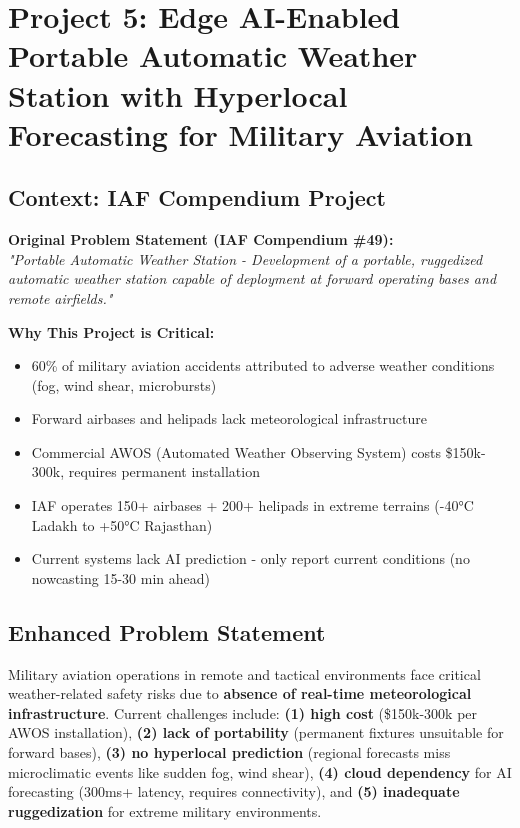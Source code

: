 \section{Project 5: Edge AI-Enabled Portable Automatic Weather Station with Hyperlocal Forecasting for Military Aviation}

\subsection{Context: IAF Compendium Project}

\textbf{Original Problem Statement (IAF Compendium \#49):} \\
\textit{"Portable Automatic Weather Station - Development of a portable, ruggedized automatic weather station capable of deployment at forward operating bases and remote airfields."}

\textbf{Why This Project is Critical:}
\begin{itemize}
    \item 60\% of military aviation accidents attributed to adverse weather conditions (fog, wind shear, microbursts)
    \item Forward airbases and helipads lack meteorological infrastructure
    \item Commercial AWOS (Automated Weather Observing System) costs \$150k-300k, requires permanent installation
    \item IAF operates 150+ airbases + 200+ helipads in extreme terrains (-40°C Ladakh to +50°C Rajasthan)
    \item Current systems lack AI prediction - only report current conditions (no nowcasting 15-30 min ahead)
\end{itemize}

\subsection{Enhanced Problem Statement}

Military aviation operations in remote and tactical environments face critical weather-related safety risks due to \textbf{absence of real-time meteorological infrastructure}. Current challenges include: \textbf{(1) high cost} (\$150k-300k per AWOS installation), \textbf{(2) lack of portability} (permanent fixtures unsuitable for forward bases), \textbf{(3) no hyperlocal prediction} (regional forecasts miss microclimatic events like sudden fog, wind shear), \textbf{(4) cloud dependency} for AI forecasting (300ms+ latency, requires connectivity), and \textbf{(5) inadequate ruggedization} for extreme military environments.


